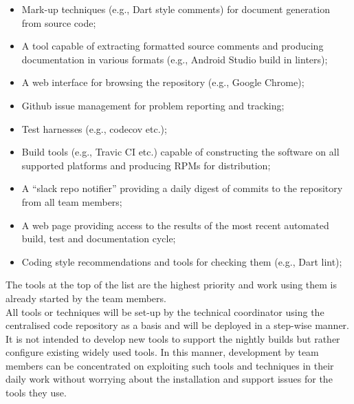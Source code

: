 \begin{itemize}
\item Mark-up techniques (e.g., Dart style comments) for document generation from source code;
\item A tool capable of extracting formatted source comments and producing documentation in various formats (e.g., Android Studio build in linters);
\item A web interface for browsing the repository (e.g., Google Chrome);
\item Github issue management for problem reporting and tracking;
\item Test harnesses (e.g., codecov etc.);
\item Build tools (e.g., Travic CI etc.) capable of constructing the software on all supported platforms and producing RPMs for distribution;
\item A “slack repo notifier” providing a daily digest of commits to the repository from all team members;
\item A web page providing access to the results of the most recent automated build, test and documentation cycle;
\item Coding style recommendations and tools for checking them (e.g., Dart lint);
\end{itemize}

\noindent The tools at the top of the list are the highest priority and work using them is already started by the team members.\\

\noindent All tools or techniques will be set-up by the technical coordinator using the centralised code repository as a basis and will be deployed in a step-wise manner. It is not intended to develop new tools to support the nightly builds but rather configure existing widely used tools. In this manner, development by team members can be concentrated on exploiting such tools and techniques in their daily work without worrying about the installation and support issues for the tools they use.
